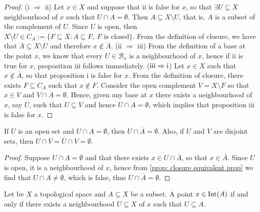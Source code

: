\begin{proof}
  (i \(\Rightarrow\) ii) Let \(x \in X\) and suppose that ii is false for \(x\),
  so that \(\exists U \subseteq X\) neighbourhood of \(x\) such that \(U \cap A
  = \emptyset\). Then \(A \subseteq X \setminus U\), that is, \(A\) is a subset
  of the complement of \(U\). Since \(U\) is open, then \(X \setminus U \in C_A
  := \{F \subseteq X : A \subseteq F,\ F \text{ is closed}\}\). From the
  definition of closure, we have that \(\overline A \subseteq X \setminus U\)
  and therefore \(x \not\in \overline A\). (ii \(\Rightarrow\) iii) From the
  definition of a base at the point \(x\), we know that every \(U \in \mathcal
  B_x\) is a neighbourhood of \(x\), hence if ii is true for \(x\), proposition
  iii follows immediately. (\(\text{iii} \Rightarrow \text i\)) Let \(x \in X\)
  such that \(x \not\in \overline A\), so that proposition i is false for \(x\).
  From the definition of closure, there exists \(F \subseteq C_A\) such that \(x
  \not\in F\). Consider the open complement \(V = X \setminus F\) so that \(x
  \in V\) and \(V \cap A = \emptyset\). Hence, given any base at \(x\) there
  exists a neighbourhood of \(x\), say \(U\), such that \(U \subseteq V\) and
  hence \(U \cap A = \emptyset\), which implies that proposition iii is false
  for \(x\).
\end{proof}

\begin{corollary}\label{cor: disjoint closure persistence}
  If \(U\) is an open set and \(U \cap A = \emptyset\), then \(U \cap \overline
  A = \emptyset\). Also, if \(U\) and \(V\) are disjoint sets, then \(U \cap
  \overline V = \overline U \cap V = \emptyset\).
\end{corollary}

\begin{proof}
  Suppose \(U \cap A = \emptyset\) and that there exists \(x \in U \cap
  \overline A\), so that \(x \in \overline A\). Since \(U\) is open, it
  is a neighbourhood of \(x\), hence from \cref{prop: closure equivalent prop}
  we find that \(U \cap A \neq \emptyset\), which is false, thus \(U \cap
  \overline A = \emptyset\).
\end{proof}

\begin{proposition}\label{prop: open set nbhd criterion}
  Let be \(X\) a topological space and \(A \subseteq X\) be a subset. A point
  \(x \in \operatorname{Int}(A)\) if and only if there exists a neighbourhood \(U \subseteq
  X\) of \(x\) such that \(U \subseteq A\).
\end{proposition}

